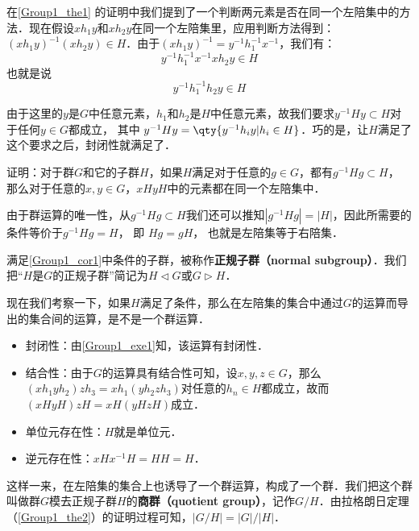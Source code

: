 在\autoref{Group1_the1} 的证明中我们提到了一个判断两元素是否在同一个左陪集中的方法．现在假设$xh_1y$和$xh_2y$在同一个左陪集里，应用判断方法得到：$(xh_1y)^{-1}(xh_2y)\in H$．由于$(xh_1y)^{-1}=y^{-1}h_1^{-1}x^{-1}$，我们有：$$y^{-1}h_1^{-1}x^{-1}xh_2y\in H$$
也就是说$$y^{-1}h^{-1}_1h_2y\in H$$

由于这里的$y$是$G$中任意元素，$h_1$和$h_2$是$H$中任意元素，故我们要求$y^{-1}Hy\subset H$对于任何$y\in G$都成立， 其中 $y^{-1}Hy = \qty{y^{-1}h_i y|h_i \in H}$．巧的是，让$H$满足了这个要求之后，封闭性就满足了．

\begin{exercise}{}\label{Group1_exe1}
证明：对于群$G$和它的子群$H$，如果$H$满足对于任意的$g\in G$，都有$g^{-1}Hg\subset H$， 那么对于任意的$x, y\in G$，$xHyH$中的元素都在同一个左陪集中．
\end{exercise}

\begin{corollary}{}\label{Group1_cor1}
由于群运算的唯一性，从$g^{-1}Hg\subset H$我们还可以推知$|g^{-1}Hg|=|H|$，因此所需要的条件等价于$g^{-1}Hg=H$， 即 $Hg = gH$， 也就是左陪集等于右陪集．
\end{corollary}

满足\autoref{Group1_cor1}中条件的子群，被称作\textbf{正规子群（normal subgroup）}．我们把“$H$是$G$的正规子群”简记为$H\triangleleft G$或$G\triangleright H$．

现在我们考察一下，如果$H$满足了条件，那么在左陪集的集合中通过$G$的运算而导出的集合间的运算，是不是一个群运算．
\begin{itemize}
\item 封闭性：由\autoref{Group1_exe1}知，该运算有封闭性．
\item 结合性：由于$G$的运算具有结合性可知，设$x, y, z\in G$，那么$(xh_1yh_2)zh_3=xh_1(yh_2zh_3)$对任意的$h_n\in H$都成立，故而$(xHyH)zH=xH(yHzH)$成立．
\item 单位元存在性：$H$就是单位元．
\item 逆元存在性：$xHx^{-1}H=HH=H$．
\end{itemize}

这样一来，在左陪集的集合上也诱导了一个群运算，构成了一个群．我们把这个群叫做群$G$模去正规子群$H$的\textbf{商群（quotient group）}，记作$G/H$．由拉格朗日定理（\autoref{Group1_the2}）的证明过程可知，$|G/H|={|G|}/{|H|}$．

